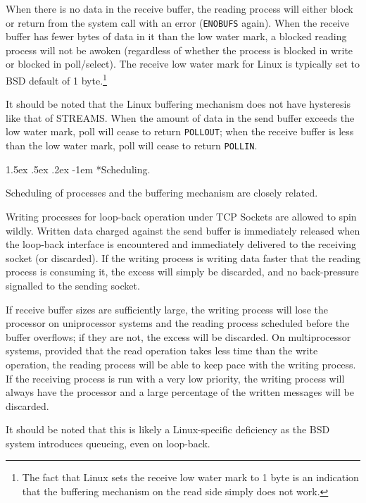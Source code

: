 \documentclass[letterpaper,final,notitlepage,twocolumn,10pt,twoside]{article}
\makeatletter
\let\normalsize = \small
\let\small = \footnotesize
\let\footnotesize = \scriptsize
\let\scriptsize = \tiny
\renewcommand\paragraph{\@startsection{paragraph}{4}{\z@}%
                                    {1.5ex \@plus .5ex \@minus .2ex}%
                                    {-1em}%
                                    {\normalfont\normalsize\bfseries\slshape}}
\makeatother
\begin{document}
When there is no data in the receive buffer, the reading process will either block or return from
the system call with an error (\texttt{ENOBUFS} again).  When the receive buffer has fewer bytes of
data in it than the low water mark, a blocked reading process will not be awoken (regardless of
whether the process is blocked in write or blocked in poll/select).  The receive low water mark for
Linux is typically set to BSD default of 1 byte.\footnote{The fact that Linux sets the receive low
water mark to 1 byte is an indication that the buffering mechanism on the read side simply does not
work.}

It should be noted that the Linux buffering mechanism does not have hysteresis like that of STREAMS.
When the amount of data in the send buffer exceeds the low water mark, poll will cease to return
\texttt{POLLOUT}; when the receive buffer is less than the low water mark, poll will cease to return
\texttt{POLLIN}.

\paragraph*{Scheduling.}

Scheduling of processes and the buffering mechanism are closely related.

Writing processes for loop-back operation under TCP Sockets are allowed to spin wildly.  Written data
charged against the send buffer is immediately released when the loop-back interface is encountered
and immediately delivered to the receiving socket (or discarded).  If the writing process is writing
data faster that the reading process is consuming it, the excess will simply be discarded, and no
back-pressure signalled to the sending socket.

If receive buffer sizes are sufficiently large, the writing process will lose the processor on
uniprocessor systems and the reading process scheduled before the buffer overflows; if they are not,
the excess will be discarded.  On multiprocessor systems, provided that the read operation takes
less time than the write operation, the reading process will be able to keep pace with the writing
process.  If the receiving process is run with a very low priority, the writing process will always
have the processor and a large percentage of the written messages will be discarded.

It should be noted that this is likely a Linux-specific deficiency as the BSD system introduces
queueing, even on loop-back.
\end{document}
